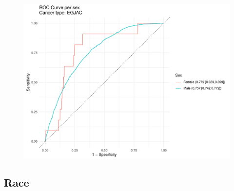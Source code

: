 \documentclass[english]{article}
\begin{document}
\begin{figure}[ht]
\includegraphics[width=1.0\linewidth]{identity/EGJAC_sex.pdf}
\end{figure}


\newpage
\clearpage
\subsection{Race}
\end{document}
